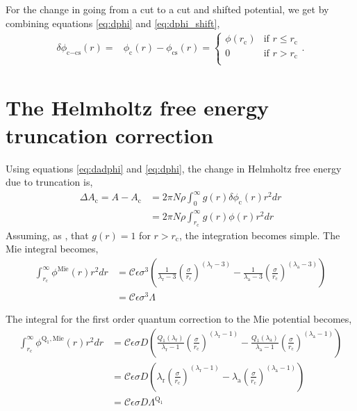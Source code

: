 \documentclass[english]{../thermomemo/thermomemo}
\newcommand*{\lb}{\left(}
\newcommand*{\rb}{\right)}
\newcommand{\mie}{\text{Mie}\xspace}
\newcommand{\lama}{\ensuremath{{\lambda_{\text{a}}}}\xspace}
\newcommand{\lamr}{\ensuremath{{\lambda_{\text{r}}}}\xspace}
\newcommand{\cut}{\ensuremath{\text{c}}\xspace}
\newcommand{\cs}{\ensuremath{\text{cs}}\xspace}
\newcommand{\Qone}{\ensuremath{\text{Q}_1}\xspace}
\begin{document}
For the change in going from a cut to a cut and shifted potential, we
get by combining equations \ref{eq:dphi} and \ref{eq:dphi_shift},
\begin{align}
  \label{eq:dphi_shift_only}
  \delta \phi_{\cut-\cs}\lb r\rb =& \phi_\cut\lb r\rb - \phi_\cs\lb r\rb =
  \begin{cases}
    \phi\lb r_\cut\rb & \text{if } r \leq r_\cut\\
    0 & \text{if } r > r_\cut\\
  \end{cases}.
\end{align}
\section{The Helmholtz free energy truncation correction}

Using equations \ref{eq:dadphi} and \ref{eq:dphi}, the change in
Helmholtz free energy due to truncation is,
\begin{align}
  \label{eq:dA}
  \Delta A_\cut = A - A_\cut &= 2 \pi N \rho \int_0^\infty g\lb r \rb \delta \phi_\cut\lb r\rb r^2 dr \\
  &= 2 \pi N \rho \int_{r_\cut}^\infty g\lb r \rb \phi\lb r\rb r^2 dr
\end{align}
Assuming, as \citeauthor{Johnson1993}, that $g\lb r \rb = 1$ for $r >
r_\cut$, the integration becomes simple. The Mie integral becomes,
\begin{align}
  \label{eq:i_mie}
  \int_{r_\cut}^\infty \phi^\mie\lb r\rb r^2 dr &= \mathcal{C}\epsilon \sigma^3
  \lb \frac{1}{\lamr - 3}\lb\frac{\sigma}{r_\cut} \rb^{\lb\lamr-3\rb} - \frac{1}{\lama - 3}\lb\frac{\sigma}{r_\cut} \rb^{\lb \lama - 3\rb} \rb\\
  &= \mathcal{C}\epsilon \sigma^3 \Lambda
\end{align}

The integral for the first order quantum correction to the Mie potential becomes,
\begin{align}
  \label{eq:i_mie_q1}
  \int_{r_\cut}^\infty \phi^{\Qone,\mie}\lb r\rb r^2 dr &= \mathcal{C}\epsilon \sigma D
                                                          \lb \frac{Q_1\lb\lamr\rb}{\lamr - 1}\lb\frac{\sigma}{r_\cut} \rb^{\lb\lamr-1\rb} - \frac{Q_1\lb\lama\rb}{\lama - 1}\lb\frac{\sigma}{r_\cut} \rb^{\lb \lama - 1\rb} \rb\\
  &= \mathcal{C}\epsilon \sigma D
  \lb \lamr\lb\frac{\sigma}{r_\cut} \rb^{\lb\lamr-1\rb} - \lama\lb\frac{\sigma}{r_\cut} \rb^{\lb \lama - 1\rb} \rb\\
  &= \mathcal{C}\epsilon \sigma D \Lambda^{\Qone}
\end{align}
\end{document}
